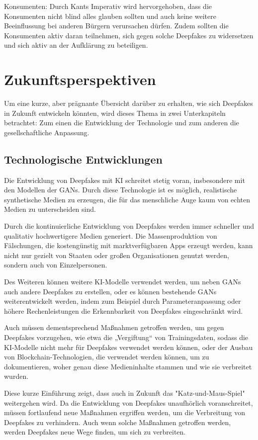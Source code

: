 \documentclass[a4paper,12pt]{article}
\begin{document}
Konsumenten:
Durch Kants Imperativ wird hervorgehoben, dass die Konsumenten nicht blind alles glauben sollten und auch keine weitere Beeinflussung bei anderen Bürgern verursachen dürfen. Zudem sollten die Konsumenten aktiv daran teilnehmen, sich gegen solche Deepfakes zu widersetzen und sich aktiv an der Aufklärung zu beteiligen. \cite{UNR2023} \cite{KantMetaphysik}
\newpage

\section{Zukunftsperspektiven}
Um eine kurze, aber prägnante Übersicht darüber zu erhalten, wie sich Deepfakes in Zukunft entwickeln könnten, wird dieses Thema in zwei Unterkapiteln betrachtet: Zum einen die Entwicklung der Technologie und zum anderen die gesellschaftliche Anpassung.
\subsection{Technologische Entwicklungen}
Die Entwicklung von Deepfakes mit KI schreitet stetig voran, insbesondere mit den Modellen der GANs. Durch diese Technologie ist es möglich, realistische synthetische Medien zu erzeugen, die für das menschliche Auge kaum von echten Medien zu unterscheiden sind.  

Durch die kontinuierliche Entwicklung von Deepfakes werden immer schneller und qualitativ hochwertigere Medien generiert. Die Massenproduktion von Fälschungen, die kostengünstig mit marktverfügbaren Apps erzeugt werden, kann nicht nur gezielt von Staaten oder großen Organisationen genutzt werden, sondern auch von Einzelpersonen. \cite{SWP2024}

Des Weiteren können weitere KI-Modelle verwendet werden, um neben GANs auch andere Deepfakes zu erstellen, oder es können bestehende GANs weiterentwickelt werden, indem zum Beispiel durch Parameteranpassung oder höhere Rechenleistungen die Erkennbarkeit von Deepfakes eingeschränkt wird. \cite{SWP2024}

Auch müssen dementsprechend Maßnahmen getroffen werden, um gegen Deepfakes vorzugehen, wie etwa die „Vergiftung“ von Trainingsdaten, sodass die KI-Modelle nicht mehr für Deepfakes verwendet werden können, oder der Ausbau von Blockchain-Technologien, die verwendet werden können, um zu dokumentieren, woher genau diese Medieninhalte stammen und wie sie verbreitet wurden. \cite{SWP2024} \cite{KAS2024}

Diese kurze Einführung zeigt, dass auch in Zukunft das "Katz-und-Maus-Spiel" weitergehen wird. Da die Entwicklung von Deepfakes unaufhörlich voranschreitet, müssen fortlaufend neue Maßnahmen ergriffen werden, um die Verbreitung von Deepfakes zu verhindern. Auch wenn solche Maßnahmen getroffen werden, werden Deepfakes neue Wege finden, um sich zu verbreiten.
\end{document}
